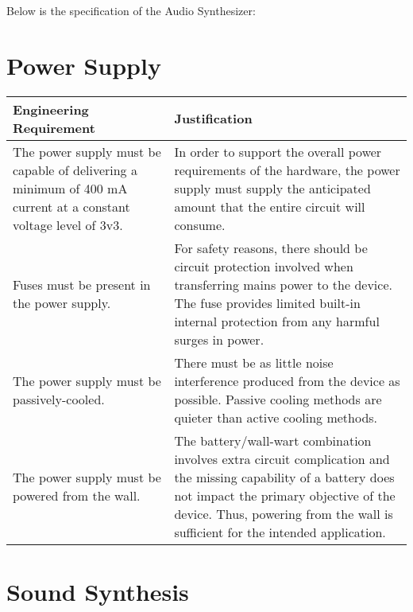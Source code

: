 \documentclass{article}
\begin{document}
\newenvironment{frcseries}{\fontfamily{frc}\selectfont}{}
\newcommand{\textfrc}[1]{{\frcseries#1}}
\newcommand{\mathfrc}[1]{\text{\textfrc{#1}}}

Below is the specification of the Audio Synthesizer:

\section{Power Supply}

\begin{tabular}{|p{3in}|p{3in}|}
\hline
Engineering Requirement & Justification \\
\hline
The power supply must be capable of delivering a minimum of 400 mA current at a constant voltage level of 3v3.&In order to support the overall power requirements of the hardware, the power supply must supply the anticipated amount that the entire circuit will consume.\\
\hline
 Fuses must be present in the power supply.&For safety reasons, there should be circuit protection involved when transferring mains power to the device.  The fuse provides limited built-in internal protection from any harmful surges in power.\\
\hline
The power supply must be passively-cooled.&There must be as little noise interference produced from the device as possible.  Passive cooling methods are quieter than active cooling methods.\\
\hline
The power supply must be powered from the wall.&The battery/wall-wart combination involves extra circuit complication and the missing capability of a battery does not impact the primary objective of the device.  Thus, powering from the wall is sufficient for the intended application.\\
\hline
\end{tabular}

\section{Sound Synthesis}
\end{document}
